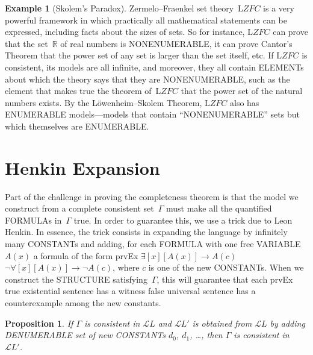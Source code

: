 \documentclass[10pt,a4paper]{article}
\newcommand*{\olup}[1]{\MakeUppercase{#1}}
\theoremstyle{plain}
\newtheorem{prop}[thm]{Proposition}
\theoremstyle{definition}
\newtheorem{ex}[thm]{Example}
\theoremstyle{remark}
\newenvironment{explain}{}{}
\newcommand*{\olfileid}[3]{}
\newcommand*{\olsection}[1]{\section*{#1}}
\newcommand*{\ollabel}[1]{\label{#1}}
\providecommand{\lif}{\mathbin{\rightarrow}}
\providecommand{\lforall}{\mathord{\forall}}
\providecommand{\lexists}{\mathord{\exists}}
\providecommand{\Obj}{}
\providecommand{\Lang}{\ensuremath{\mathcal{L}}}
\providecommand{\Log}{\ensuremath{\mathrm{L}}}
\providecommand{\iftag}[1]{#1}
\providecommand{\Real}{\mathbb{R}}
\providecommand{\iftag}{}
\begin{document}
\begin{ex}[Skolem's Paradox]
Zermelo--Fraenkel set theory~$\Log{ZFC}$ is a very powerful framework
in which practically all mathematical statements can be expressed,
including facts about the sizes of sets. So for instance, $\Log{ZFC}$
can prove that the set~$\Real$ of real numbers is \olup{nonenumerable},
it can prove Cantor's Theorem that the power set of any set is larger
than the set itself, etc.  If $\Log{ZFC}$ is consistent, its models
are all infinite, and moreover, they all contain \olup{element}s about
which the theory says that they are \olup{nonenumerable}, such as the
element that makes true the theorem of~$\Log{ZFC}$ that the power set
of the natural numbers exists. By the L\"owenheim--Skolem Theorem,
$\Log{ZFC}$ also has \olup{enumerable} models---models that contain
``\olup{nonenumerable}'' sets but which themselves are \olup{enumerable}.
\end{ex}





\olfileid{fol}{com}{hen}

\olsection{Henkin Expansion}

\begin{explain}
Part of the challenge in proving the completeness theorem is that the
model we construct from a complete consistent set~$\Gamma$ must make
all the quantified \olup{formula}s in~$\Gamma$ true.  In order to
guarantee this, we use a trick due to Leon Henkin.  In essence, the
trick consists in expanding the language by infinitely many \olup{constant}s
and adding, for each \olup{formula} with one free \olup{variable} $A(x)$ a
formula of the form
\iftag{prvEx}
      {$\lexists[x][A(x)] \lif A(c)$}
      {$\lnot\lforall[x][A(x)] \lif \lnot A(c)$},
where $c$ is one of the new \olup{constant}s.  When we construct the
\olup{structure} satisfying~$\Gamma$, this will guarantee that each
\iftag{prvEx}
{true existential sentence has a witness}
{false universal sentence has a counterexample}
among the new constants.
\end{explain}

\begin{prop}
\ollabel{prop:lang-exp}
If $\Gamma$ is consistent in $\Lang L$ and $\Lang L'$ is obtained from
$\Lang L$ by adding \olup{denumerable} set of new \olup{constant}s $\Obj d_0$,
$\Obj d_1$, \dots, then $\Gamma$ is consistent in~$\Lang L'$.
\end{prop}
\end{document}
